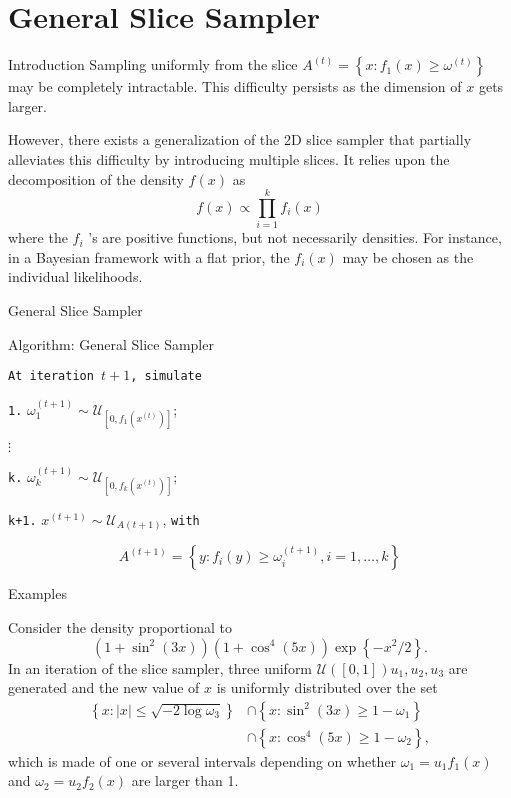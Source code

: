 \documentclass{beamer}
\begin{document}
	\section{General Slice Sampler}
\begin{frame}{Introduction}
	Sampling uniformly from the slice $A^{(t)}=\left\{x : f_{1}(x) \geq \omega^{(t)}\right\}$ may be completely intractable. This difficulty persists as the dimension of $x$ gets larger. 
	
	However, there exists a generalization of the 2D slice sampler that partially alleviates this difficulty by introducing multiple slices. It relies upon the decomposition of the density $f(x)$ as
	$$
	f(x) \propto \prod_{i=1}^{k} f_{i}(x)
	$$
	where the $f_{i}$ 's are positive functions, but not necessarily densities. For instance, in a Bayesian framework with a flat prior, the $f_{i}(x)$ may be chosen as the individual likelihoods.
\end{frame}
\begin{frame}{General Slice Sampler}
	\begin{block}{Algorithm: General Slice Sampler}
		\begin{spacing}{1.5}
	\texttt{At iteration $t+1$, simulate}

	\texttt{1.} $\omega_{1}^{(t+1)} \sim \mathcal{U}_{[0, f_{1}(x^{(t)})]}$;
	
	$\vdots$
	
	\texttt{k.} $\omega_{k}^{(t+1)} \sim \mathcal{U}_{[0, f_{k}(x^{(t)})]}$;
	
	\texttt{k+1.} $x^{(t+1)} \sim \mathcal{U}_{A(t+1)}$, \texttt{with}

$$
A^{(t+1)}=\left\{y : f_{i}(y) \geq \omega_{i}^{(t+1)}, i=1, \ldots, k\right\}
$$
\end{spacing}
	\end{block}
\end{frame}
\begin{frame}{Examples}
	\begin{example}
	Consider the density proportional to
$$
\left(1+\sin ^{2}(3 x)\right)\left(1+\cos ^{4}(5 x)\right) \exp \left\{-x^{2} / 2\right\} .
$$
In an iteration of the slice sampler, three uniform $\mathcal{U}([0,1]) u_{1}, u_{2}, u_{3}$ are generated and the new value of $x$ is uniformly distributed over the set
$$
\begin{aligned}
\left\{x:|x| \leq \sqrt{-2 \log \omega_{3}}\right\} &\cap\left\{x: \sin ^{2}(3 x) \geq 1-\omega_{1}\right\} \\ &\cap\left\{x: \cos ^{4}(5 x) \geq 1-\omega_{2}\right\},
\end{aligned}
$$
which is made of one or several intervals depending on whether $\omega_{1}=u_{1} f_{1}(x)$ and $\omega_{2}=u_{2} f_{2}(x)$ are larger than 1. 
	\end{example}

\end{frame}
\end{document}

